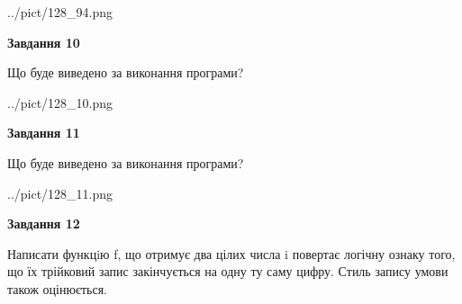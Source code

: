 \documentclass[12pt, ukrainian]{article}
\begin{document}
{\begin {large}
\begin{center}
	{../pict/128_94.png}
\end{center}
\newpage

{\begin {center}\textbf{Завдання 10}\end {center}}

Що буде виведено за виконання програми?\par
\begin{center}
	{../pict/128_10.png}
\end{center}
\newpage

{\begin {center}\textbf{Завдання 11}\end {center}}

Що буде виведено за виконання програми?\par
\begin{center}
	{../pict/128_11.png}
\end{center}
\newpage

{\begin {center}\textbf{Завдання 12}\end {center}}


Написати функцiю f, що отримує два цілих числа i повертає логічну ознаку того, що їх трійковий запис закінчується на одну ту саму цифру. Стиль запису умови також оцінюється.\par
\newpage

\end {large}}
\end{document}
